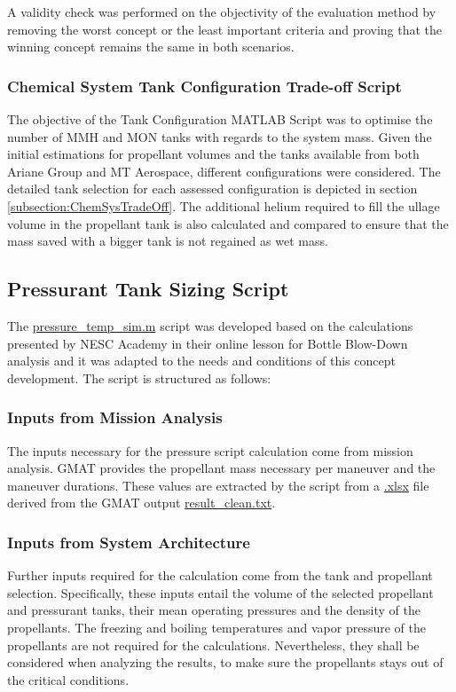 A validity check was performed on the objectivity of the evaluation method by removing the worst concept or the least important criteria and proving that the winning concept remains the same in both scenarios. 

\subsubsection{Chemical System Tank Configuration Trade-off Script}
The objective of the Tank Configuration MATLAB Script was to optimise the number of MMH and MON tanks with regards to the system mass. Given the initial estimations for propellant volumes and the tanks available from both Ariane Group and MT Aerospace, different configurations were considered. The detailed tank selection for each assessed configuration is depicted in section \ref{subsection:ChemSysTradeOff}. The additional helium required to fill the ullage volume in the propellant tank is also calculated and compared to ensure that the mass saved with a bigger tank is not regained as wet mass.
\subsection{Pressurant Tank Sizing Script}
The \href{https://github.com/Sven-J-Steinert/MomenTUM/blob/main/MATLAB/pressure_temp_sim.m}{\colorbox{codegray}{pressure\_temp\_sim.m}} script was developed based on the calculations presented by NESC Academy in their online lesson for Bottle Blow-Down analysis \cite{BottleBl30:online} and it was adapted to the needs and conditions of this concept development. The script is structured as follows:
\subsubsection{Inputs from Mission Analysis}
The inputs necessary for the pressure script calculation come from mission analysis. GMAT provides the propellant mass necessary per maneuver and the maneuver durations. These values are extracted by the script from a \href{https://github.com/Sven-J-Steinert/MomenTUM/blob/main/MATLAB/GMAT_values_20.xlsx}{\colorbox{codegray}{.xlsx}} file derived from the GMAT output \href{https://github.com/Sven-J-Steinert/MomenTUM/blob/main/GMAT/result/result_clean.txt}{\colorbox{codegray}{result\_clean.txt}}.
\subsubsection{Inputs from System Architecture}
Further inputs required for the calculation come from the tank and propellant selection. Specifically, these inputs entail the volume of the selected propellant and pressurant tanks, their mean operating pressures and the density of the propellants. The freezing and boiling temperatures and vapor pressure of the propellants are not required for the calculations. Nevertheless, they shall be considered  when analyzing the results, to make sure the propellants stays out of the critical conditions. 
